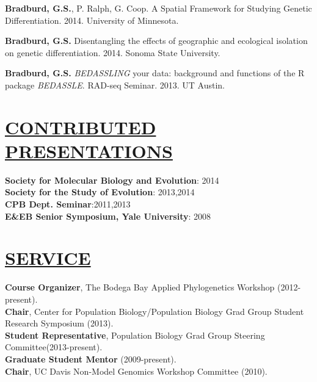 \documentclass{res}
\begin{document}
\begin{resume}
\textbf{Bradburd, G.S.}, P. Ralph, G. Coop.  A Spatial Framework for Studying Genetic Differentiation.  2014.  University of Minnesota.

\textbf{Bradburd, G.S.} Disentangling the effects of geographic and ecological isolation on genetic differentiation.  2014.  Sonoma State University.

\textbf{Bradburd, G.S.} \textit{BEDASSLING} your data: background and functions of the R package \textit{BEDASSLE}.  RAD-seq Seminar. 2013. UT Austin.


\section{\underline{CONTRIBUTED PRESENTATIONS}}
\textbf{Society for Molecular Biology and Evolution}: 2014\\
\textbf{Society for the Study of Evolution}: 2013,2014\\
\textbf{CPB Dept. Seminar}:2011,2013\\
\textbf{E\&EB Senior Symposium, Yale University}: 2008\\





\section{\underline{SERVICE}}
\textbf{Course Organizer}, The Bodega Bay Applied Phylogenetics Workshop (2012-present).\\
%
\textbf{Chair}, Center for Population Biology/Population Biology Grad Group Student Research Symposium (2013).\\
%
\textbf{Student Representative}, Population Biology Grad Group Steering Committee(2013-present).\\
%
\textbf{Graduate Student Mentor} (2009-present). \\
%
\textbf{Chair}, UC Davis Non-Model Genomics Workshop Committee (2010).
%

\end{resume}
\end{document}
